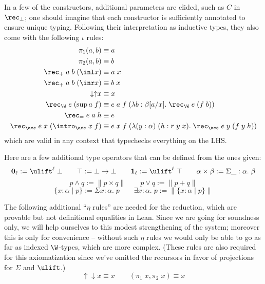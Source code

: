 In a few of the constructors, additional parameters are elided, such as $C$ in $\rec_\bot$; one should imagine that each constructor is sufficiently annotated to ensure unique typing. Following their interpretation as inductive types, they also come with the following $\iota$ rules:
\begin{align*}
\pi_1(a,b)&\equiv a\\
\pi_2(a,b)&\equiv b\\
\rec_+\;a\;b\;(\inl x)&\equiv a\;x\\
\rec_+\;a\;b\;(\inr x)&\equiv b\;x\\
{\downarrow\uparrow} x&\equiv x\\
\rec_\W\;e\;(\sup a\;f)&\equiv e\;a\;f\;(\lambda b:\beta[a/x].\;\rec_\W\;e\;(f\;b))\\
\rec_=\;e\;a\;h&\equiv e\\
\rec_\acc\;e\;x\;(\intro_\acc\;x\;f)&\equiv e\;x\;f\;(\lambda (y:\alpha)\;(h:r\;y\;x).\;\rec_\acc\;e\;y\;(f\;y\;h))
\end{align*}
which are valid in any context that typechecks everything on the LHS.

Here are a few additional type operators that can be defined from the ones given:
$${\bf 0}_\ell:=\ulift^\ell\;\bot\qquad\top:=\bot\to\bot\qquad{\bf 1}_\ell:=\ulift^\ell\;\top\qquad \alpha\times \beta:=\Sigma\_:\alpha.\;\beta$$
$$p\land q:=\|p\times q\|\qquad p\lor q:=\|p+q\|$$
$$\{x:\alpha\mid p\}:=\Sigma x:\alpha.\;p\qquad
\exists x:\alpha.\; p:=\|\{x:\alpha\mid p\}\|$$

The following additional ``$\eta$ rules'' are needed for the reduction, which are provable but not definitional equalities in Lean. Since we are going for soundness only, we will help ourselves to this modest strengthening of the system; moreover this is only for convenience -- without such $\eta$ rules we would only be able to go as far as indexed $\W$-types, which are more complex. (These rules are also required for this axiomatization since we've omitted the recursors in favor of projections for $\Sigma$ and $\ulift$.)
$${\uparrow\downarrow} x\equiv x\qquad (\pi_1\;x,\pi_2\;x)\equiv x$$
%
